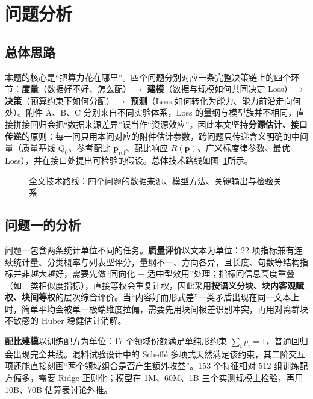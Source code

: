 \section{问题分析}
\label{sec:analysis}

\subsection{总体思路}

本题的核心是“把算力花在哪里”。四个问题分别对应一条完整决策链上的四个环节：\textbf{度量}（数据好不好、怎么配）$\rightarrow$ \textbf{建模}（数据与规模如何共同决定 Loss）$\rightarrow$ \textbf{决策}（预算约束下如何分配）$\rightarrow$ \textbf{预测}（Loss 如何转化为能力、能力前沿走向何处）。附件 A、B、C 分别来自不同实验体系，Loss 的量纲与模型族并不相同，直接拼接回归会把“数据来源差异”误当作“资源效应”。因此本文坚持\textbf{分源估计、接口传递}的原则：每一问只用本问对应的附件估计参数，跨问题只传递含义明确的中间量（质量基线 $Q_0$、参考配比 $\boldsymbol p_{\mathrm{ref}}$、配比响应 $R(\boldsymbol p)$、广义标度律参数、最优 Loss），并在接口处提出可检验的假设。总体技术路线如图~\ref{fig:overall}所示。

\begin{figure}[htbp]
\centering
\resizebox{\linewidth}{!}{}
\caption{全文技术路线：四个问题的数据来源、模型方法、关键输出与检验关系}
\label{fig:overall}
\end{figure}

\subsection{问题一的分析}

问题一包含两条统计单位不同的任务。\textbf{质量评价}以文本为单位：22 项指标兼有连续统计量、分类概率与列表型评分，量纲不一、方向各异，且长度、句数等结构指标并非越大越好，需要先做“同向化 + 适中型效用”处理；指标间信息高度重叠（如三类相似度指标），直接等权会重复计权，因此采用\textbf{按语义分块、块内客观赋权、块间等权}的层次综合评价。当“内容好而形式差”一类矛盾出现在同一文本上时，简单平均会被单一极端维度拉偏，需要先用块间极差识别冲突，再用对离群块不敏感的 Huber 稳健估计消解。

\textbf{配比建模}以训练配方为单位：17 个领域份额满足单纯形约束 $\sum_ip_i=1$，普通回归会出现完全共线。混料试验设计中的 Scheff\'e 多项式\cite{scheffe1958mixtures,cornell2002mixtures}天然满足该约束，其二阶交互项还能直接刻画“两个领域组合是否产生额外收益”。153 个特征相对 512 组训练配方偏多，需要 Ridge 正则化；模型在 1M、60M、1B 三个实测规模上检验，再用 10B、70B 估算表讨论外推。


